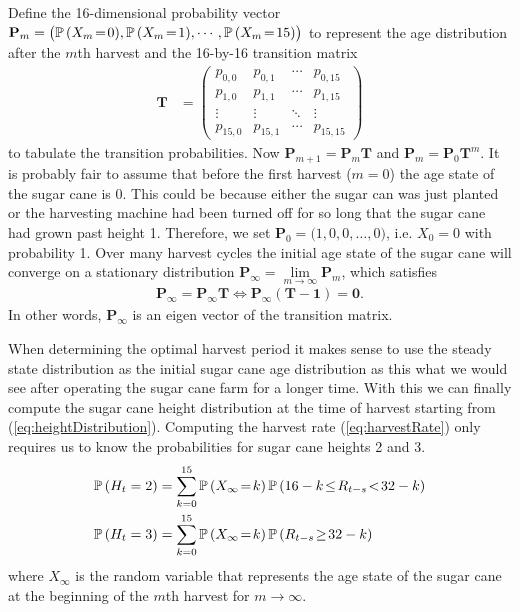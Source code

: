 	Define the 16-dimensional probability vector
	$\mathbf{P}_m = \big(\Prob{X_m\!=\!0}, \Prob{X_m\!=\!1}, \cdots,
	\Prob{X_m\!=\!15}\big)$
	to represent the age distribution after the $m$th harvest and the 16-by-16 transition
	matrix
	\begin{align}
		\mathbf{T}
		&= \left(\begin{matrix}
			p_{0,0} & p_{0,1} & \cdots & p_{0,15}
			\\p_{1,0} & p_{1,1} & \cdots & p_{1,15}
			\\\vdots & \vdots & \ddots & \vdots
			\\p_{15,0} & p_{15,1} & \cdots & p_{15,15}
		\end{matrix}\right)
	\end{align}
	to tabulate the transition probabilities.
	Now $\mathbf{P}_{m+1} = \mathbf{P}_m\mathbf{T}$ and $\mathbf{P}_m =
	\mathbf{P}_0\mathbf{T}^m$. It is probably fair to assume that before the first
	harvest ($m=0$) the age state of the sugar cane is 0. This could be because either the
	sugar can was just planted or the harvesting machine had been turned off for so long
	that the sugar cane had grown past height 1. Therefore, we set $\mathbf{P}_0
	= \big(1,0,0,\ldots,0\big)$, i.e. $X_0=0$ with probability 1.
	Over many harvest cycles the initial age state of the sugar cane will converge on a
	stationary distribution $\mathbf{P}_\infty =
	\lim\limits_{m\rightarrow\infty}\mathbf{P}_m$,
	which satisfies
	\begin{align}
		\mathbf{P}_\infty = \mathbf{P}_\infty\mathbf{T} \iff
		\mathbf{P}_\infty(\mathbf{T}-\mathbf{1})=\mathbf{0}.
	\end{align}
	In other words, $\mathbf{P}_\infty$ is an eigen vector of the transition matrix.

	When determining the optimal harvest period it makes sense to use the steady state
	distribution as the initial sugar cane age distribution as this what we would see
	after operating the sugar cane farm for a longer time.
	With this we can finally compute
	the sugar cane height distribution at the time of harvest starting from
	(\ref{eq:heightDistribution}). Computing the harvest rate (\ref{eq:harvestRate})
	only requires us to know the probabilities for sugar cane heights 2 and 3.
	\begin{align}\label{eq:heightDistribution2}
		\Prob{H_t=2} &=
			\sum_{k=0}^{15}\Prob{X_\infty\!=\!k}\,\Prob{16-k\!\leq\!R_{t-s}\!<\!32-k}
		\\\Prob{H_t=3} &=
			\sum_{k=0}^{15}\Prob{X_\infty\!=\!k}\,\Prob{R_{t-s}\!\geq\!32-k}
	\end{align}
	where $X_\infty$ is the random variable that represents the age state of the sugar
	cane at the beginning of the $m$th harvest for $m\rightarrow\infty$.

